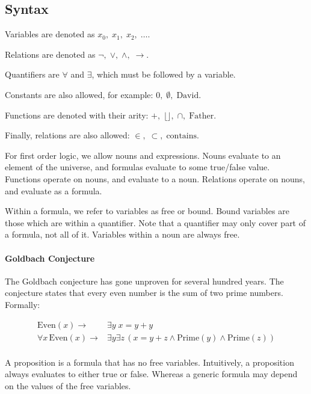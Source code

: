 \documentclass{idc_msc}
\begin{document}
\subsection{Syntax}

Variables are denoted as \(x_0,\; x_1,\; x_2,\; \ldots\).

Relations are denoted as \(\lnot,\; \lor,\; \land,\; \to\).

Quantifiers are \(\forall\) and \(\exists\), which must be followed by a variable.


Constants are also allowed, for example: \(0,\; \emptyset,\; \mathrm{David}\).

Functions are denoted with their arity: \(+,\; \lfloor \rfloor,\; \cap,\; \mathrm{Father}\).

Finally, relations are also allowed: \(\in,\; \subset,\; \mathrm{contains}\).

For first order logic, we allow nouns and expressions.
Nouns evaluate to an element of the universe, and formulas evaluate to some true/false value.
Functions operate on nouns, and evaluate to a noun.
Relations operate on nouns, and evaluate as a formula.

Within a formula, we refer to variables as free or bound.
Bound variables are those which are within a quantifier.
Note that a quantifier may only cover part of a formula, not all of it.
Variables within a noun are always free.

\paragraph{Goldbach Conjecture}

The Goldbach conjecture has gone unproven for several hundred years.
The conjecture states that every even number is the sum of two prime numbers.
Formally:

\[
\begin{aligned}
  \mathrm{Even}(x) \to& \exists y\; x = y + y \\
  \forall x \,\mathrm{Even}(x) \to& \exists y \exists z \, (x = y + z \land \mathrm{Prime}(y) \land \mathrm{Prime}(z)) \\
\end{aligned}
\]

A proposition is a formula that has no free variables.
Intuitively, a proposition always evaluates to either true or false.
Whereas a generic formula may depend on the values of the free variables.
\end{document}
